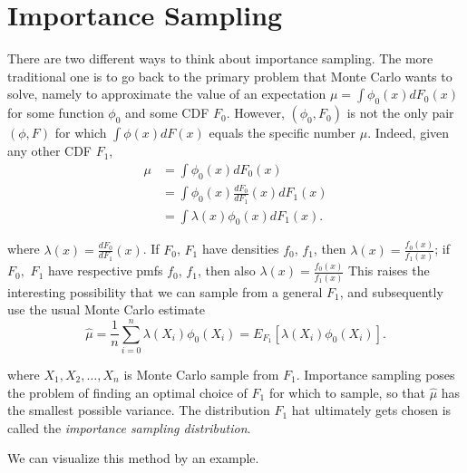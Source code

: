 \chapter{Importance Sampling}
There are two different ways to think about importance sampling.
The more traditional one is to go back to the primary problem that
Monte Carlo  wants to solve,
namely to approximate the value of an expectation
$\mu = \int \phi_0(x)dF_0(x) $ for some function $\phi_0$ and some CDF $F_0$.
However, $(\phi_0,F_0)$ is not the only pair $(\phi,F)$ for which
$\int \phi(x)dF(x) $ equals the specific number $\mu$. Indeed, given any other
CDF $F_1$,
\begin{align*}
	\mu & = \int \phi_0(x)dF_0(x)                      \\
	    & = \int \phi_0(x)\frac{dF_0}{dF_1}(x) dF_1(x) \\
	    & = \int \lambda(x)\phi_0(x)dF_1(x).
\end{align*}

where $\lambda(x)=\frac{dF_0}{dF_1}(x)$. If $F_0$, $F_1$ have densities
$f_0$, $f_1$, then $\lambda(x)=\frac{f_0(x)}{f_1(x)}$; if $F_0,$ $F_1$
have respective pmfs $f_0$, $f_1$, then also $\lambda(x)=\frac{f_0(x)}{f_1(x)}$
This raises the interesting possibility that we can sample from a general $F_1$, and
subsequently use the usual Monte Carlo estimate
\[
	\hat{\mu} = \frac{1}{n} \sum_{i = 0}^{n} \lambda(X_i)\phi_0(X_i) = E_{F_1}[\lambda(X_i)\phi_0(X_i)].
\]

where $X_1, X_2, \ldots, X_n$ is Monte Carlo sample from $F_1$.
Importance sampling poses the problem of finding an optimal choice of $F_1$ for which to sample,
so that $\hat{\mu}$ has the smallest possible variance.
The distribution $F_1$ hat ultimately gets
chosen is called the \textit{importance sampling distribution}.

We can visualize this method by an example.

